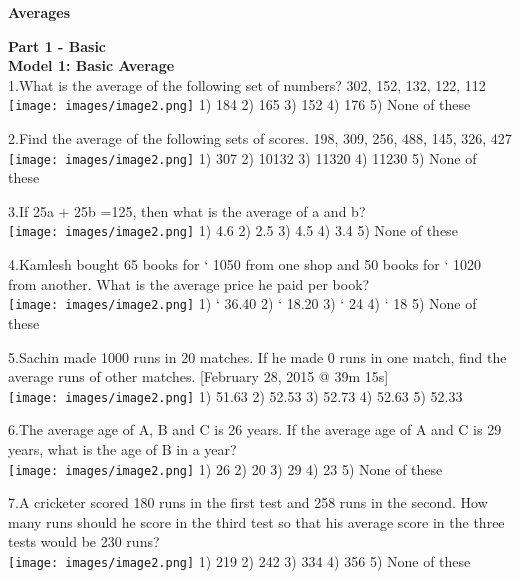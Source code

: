 \documentclass[
]{article}
\author{}
\date{}
\begin{document}
	

\begin{center}
	{\Large \textbf{Averages \\}}
\end{center}
{\large \textbf{Part 1 - Basic \\}}
\textbf{Model 1: Basic Average \\}
1.What is the average of the following set of numbers? 302, 152, 132, 122, 112  \\
\texttt{[image: images/image2.png]}   1) 184 	2) 165 	3) 152 	4) 176 	5) None of these

2.Find the average of the following sets of scores. 198, 309, 256, 488, 145, 326, 427  \\
\texttt{[image: images/image2.png]}   1) 307 	2) 10132 	3) 11320 	4) 11230 	5) None of these

3.If 25a + 25b =125, then what is the average of a and b?  \\
\texttt{[image: images/image2.png]}   1) 4.6 	2) 2.5 	3) 4.5 	4) 3.4 	5) None of these

4.Kamlesh bought 65 books for ` 1050 from one shop and 50 books for ` 1020 from another. What is the average price he paid per book? \\
\texttt{[image: images/image2.png]}    1) ` 36.40 	2) ` 18.20 	3) ` 24 	4) ` 18 	5) None of these

5.Sachin made 1000 runs in 20 matches. If he made 0 runs in one match, find the average runs of other matches. [February 28, 2015 @ 39m 15s] \\
\texttt{[image: images/image2.png]}   1) 51.63 	2) 52.53 	 3) 52.73 	4) 52.63 	5) 52.33

6.The average age of A, B and C is 26 years. If the average age of A and C is 29 years, what is the age of B in a year? \\
\texttt{[image: images/image2.png]} 1) 26 	2) 20 	3) 29 	4) 23 	5) None of these

7.A cricketer scored 180 runs in the first test and 258 runs in the second. How many runs should he score in the third test so that his average score in the three tests would be 230 runs?  \\
\texttt{[image: images/image2.png]}   1) 219 	2) 242 	3) 334 	4) 356 	5) None of these
\end{document}
